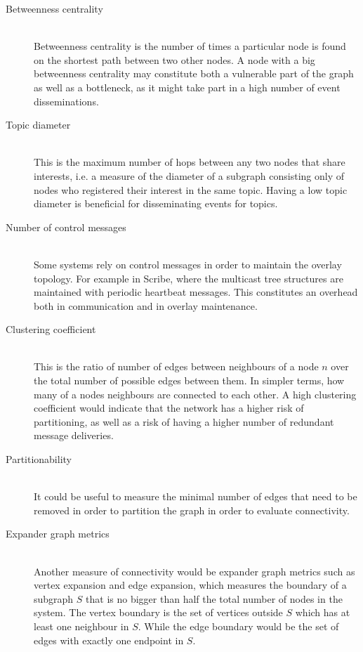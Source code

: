     \begin{description}

    \item[Betweenness centrality]\hfill\\
        Betweenness centrality is the number of times a particular node
        is found on the shortest path between two other nodes. A node
        with a big betweenness centrality may constitute both a
        vulnerable part of the graph as well as a bottleneck, as it
        might take part in a high number of event disseminations.

    \item[Topic diameter]\hfill\\
        This is the maximum number of hops between any two nodes that
        share interests, i.e. a measure of the diameter of a subgraph
        consisting only of nodes who registered their interest in the
        same topic. Having a low topic diameter is beneficial for
        disseminating events for topics.

    \item[Number of control messages]\hfill\\ 
        Some systems rely on
        control messages in order to maintain the overlay topology. For
        example in Scribe, where the multicast tree structures are
        maintained with periodic heartbeat messages. This constitutes an
        overhead both in communication and in overlay maintenance.

    \item[Clustering coefficient]\hfill\\ 
        This is the ratio of number of edges between neighbours of a node $n$ over
        the total number of possible edges between them. In simpler
        terms, how
        many of a nodes neighbours are connected to each other. A high
        clustering coefficient would indicate that the network has a
        higher risk of partitioning, as well as a risk of having a
        higher number of redundant message deliveries.

    \item[Partitionability]\hfill\\ 
        It could be useful to measure the minimal number of edges that
        need to be removed in order to partition the graph in order to
        evaluate connectivity. 

    \item[Expander graph metrics]\hfill\\ 
        Another measure of connectivity would be expander graph metrics
        such as vertex expansion and edge expansion, which measures the
        boundary of a subgraph $S$ that is no bigger than half the total
        number of nodes in the system. The vertex boundary is the set of
        vertices outside $S$ which has at least one neighbour in $S$.
        While the edge boundary would be the set of edges with exactly
        one endpoint in $S$.

    \end{description}

